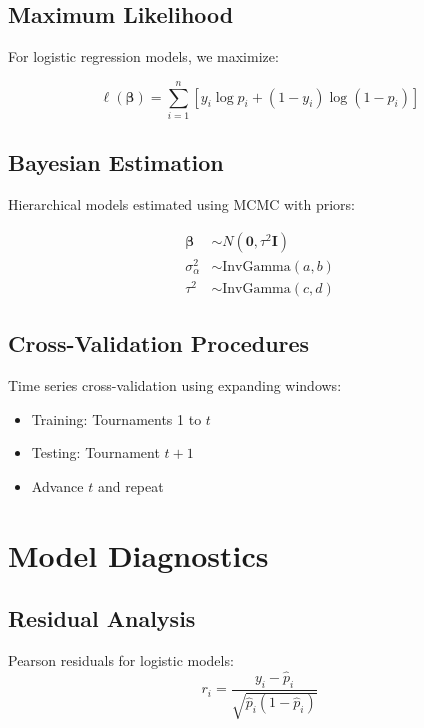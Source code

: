 \subsection{Maximum Likelihood}

For logistic regression models, we maximize:

\begin{equation}
\ell(\boldsymbol{\beta}) = \sum_{i=1}^n \left[ y_i \log p_i + (1-y_i) \log(1-p_i) \right]
\end{equation}

\subsection{Bayesian Estimation}

Hierarchical models estimated using MCMC with priors:

\begin{align}
\boldsymbol{\beta} &\sim N(\mathbf{0}, \tau^2 \mathbf{I}) \\
\sigma_{\alpha}^2 &\sim \text{InvGamma}(a, b) \\
\tau^2 &\sim \text{InvGamma}(c, d)
\end{align}

\subsection{Cross-Validation Procedures}

Time series cross-validation using expanding windows:
\begin{itemize}
\item Training: Tournaments 1 to $t$
\item Testing: Tournament $t+1$
\item Advance $t$ and repeat
\end{itemize}

\section{Model Diagnostics}

\subsection{Residual Analysis}

Pearson residuals for logistic models:
\begin{equation}
r_i = \frac{y_i - \hat{p}_i}{\sqrt{\hat{p}_i(1-\hat{p}_i)}}
\end{equation}

